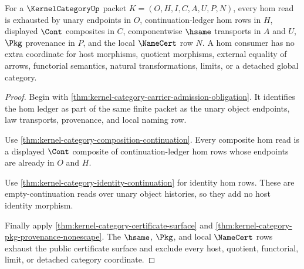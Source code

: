 \begin{theorem}
\label{thm:kernel-category-hom-ledger-exhaustion}
For a $\KernelCategoryUp$ packet $K=(O,H,I,C,A,U,P,N)$, every hom read is exhausted by unary endpoints in $O$, continuation-ledger hom rows in $H$, displayed $\Cont$ composites in $C$, componentwise $\hsame$ transports in $A$ and $U$, $\Pkg$ provenance in $P$, and the local $\NameCert$ row $N$. A hom consumer has no extra coordinate for host morphisms, quotient morphisms, external equality of arrows, functorial semantics, natural transformations, limits, or a detached global category.
\end{theorem}
\begin{proof}
Begin with \autoref{thm:kernel-category-carrier-admission-obligation}. It identifies the hom ledger as part of the same finite packet as the unary object endpoints, law transports, provenance, and local naming row.

Use \autoref{thm:kernel-category-composition-continuation}. Every composite hom read is a displayed $\Cont$ composite of continuation-ledger hom rows whose endpoints are already in $O$ and $H$.

Use \autoref{thm:kernel-category-identity-continuation} for identity hom rows. These are empty-continuation reads over unary object histories, so they add no host identity morphism.

Finally apply \autoref{thm:kernel-category-certificate-surface} and \autoref{thm:kernel-category-pkg-provenance-nonescape}. The $\hsame$, $\Pkg$, and local $\NameCert$ rows exhaust the public certificate surface and exclude every host, quotient, functorial, limit, or detached category coordinate.
\end{proof}

